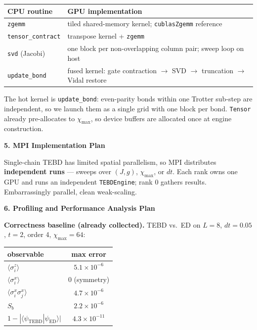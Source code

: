 \documentclass[11pt]{article}
\begin{document}
\begin{center}
\begin{tabular}{ll}
\toprule
\textbf{CPU routine} & \textbf{GPU implementation} \\
\midrule
\texttt{zgemm}            & tiled shared-memory kernel; \texttt{cublasZgemm} reference \\
\texttt{tensor\_contract} & transpose kernel + \texttt{zgemm} \\
\texttt{svd} (Jacobi)     & one block per non-overlapping column pair; sweep loop on host \\
\texttt{update\_bond}     & fused kernel: gate contraction $\to$ SVD $\to$ truncation $\to$ Vidal restore \\
\bottomrule
\end{tabular}
\end{center}

The hot kernel is \texttt{update\_bond}: even-parity bonds within one Trotter sub-step are independent, so we launch them as a single grid with one block per bond. \texttt{Tensor} already pre-allocates to $\chi_{\max}$, so device buffers are allocated once at engine construction.

\vspace{0.4em}
\textbf{5. MPI Implementation Plan}

Single-chain TEBD has limited spatial parallelism, so MPI distributes \textbf{independent runs} --- sweeps over $(J, g)$, $\chi_{\max}$, or $dt$. Each rank owns one GPU and runs an independent \texttt{TEBDEngine}; rank 0 gathers results. Embarrassingly parallel, clean weak-scaling.

\vspace{0.4em}
\textbf{6. Profiling and Performance Analysis Plan}

\textbf{Correctness baseline (already collected).} TEBD vs.\ ED on $L = 8$, $dt = 0.05$, $t = 2$, order 4, $\chi_{\max} = 64$:

\begin{center}
\begin{tabular}{lc}
\toprule
\textbf{observable} & \textbf{max error} \\
\midrule
$\langle\sigma^z_i\rangle$               & $5.1 \times 10^{-6}$ \\
$\langle\sigma^x_i\rangle$               & $0$ (symmetry) \\
$\langle\sigma^x_i \sigma^x_j\rangle$    & $4.7 \times 10^{-6}$ \\
$S_b$                                    & $2.2 \times 10^{-6}$ \\
$1 - |\langle\psi_{\mathrm{TEBD}} | \psi_{\mathrm{ED}}\rangle|$ & $4.3 \times 10^{-11}$ \\
\bottomrule
\end{tabular}
\end{center}
\end{document}
